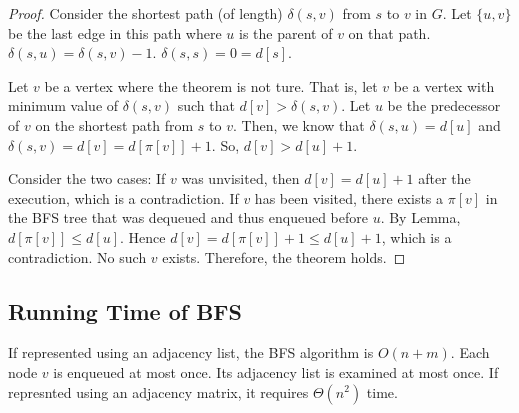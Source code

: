 \begin{proof}
    Consider the shortest path (of length) $\delta(s,v)$ from $s$ to $v$ in $G$. Let $\{u,v\}$ be the last edge in this path where $u$ is the parent of $v$ on that path. $\delta(s,u) = \delta(s,v) - 1$. $\delta(s,s) = 0 = d[s]$.

    Let $v$ be a vertex where the theorem is not ture. That is, let $v$ be a vertex with minimum value of $\delta(s,v)$ such that $d[v] > \delta(s,v)$. Let $u$ be the predecessor of $v$ on the shortest path from $s$ to $v$. Then, we know that $\delta(s,u) = d[u]$ and $\delta(s,v) = d[v] = d[\pi[v]]+1$. So, $d[v] > d[u] + 1$. 
    
    Consider the two cases: If $v$ was unvisited, then $d[v] = d[u] + 1$ after the execution, which is a contradiction. If $v$ has been visited, there exists a $\pi[v]$ in the BFS tree that was dequeued and thus enqueued before $u$. By Lemma, $d[\pi[v]] \leq d[u]$. Hence $d[v] = d[\pi[v]] + 1 \leq d[u] + 1$, which is a contradiction. No such $v$ exists. Therefore, the theorem holds.
\end{proof}

\subsection{Running Time of BFS}

If represented using an adjacency list, the BFS algorithm is $O(n+m)$. Each node $v$ is enqueued at most once. Its adjacency list is examined at most once. If represnted using an adjacency matrix, it requires $\Theta(n^2)$ time.

